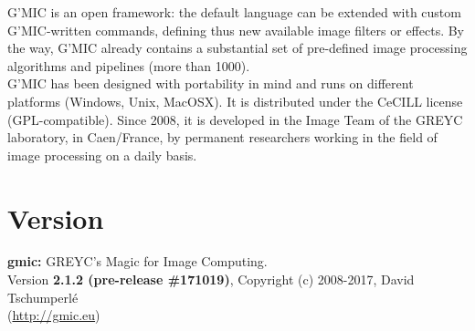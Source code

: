 \documentclass[a4paper,10.5pt,twoside]{book}
\newcommand{\Ca}[1]{\textcolor{ca}{#1}}
\newcommand{\Cb}[1]{\textcolor{cb}{#1}}
\newcommand{\Cc}[1]{\textcolor{cc}{#1}}
\begin{document}
\Cc{G'MIC} is an open framework: the default language can be extended with custom \Cc{G'MIC}-written commands, defining thus new available image filters or effects. By the way, \Cc{G'MIC} already contains a substantial set of pre-defined image processing algorithms and pipelines (more than 1000).\\ 
 
\Cc{G'MIC} has been designed with portability in mind and runs on different platforms (Windows, Unix, MacOSX). It is distributed under the CeCILL license (GPL-compatible). Since 2008, it is developed in the Image Team of the GREYC laboratory, in Caen/France, by permanent researchers working in the field of image processing on a daily basis. 
\section*{Version} 
 
 \Ca{\textbf{gmic:} GREYC's Magic for Image Computing.}\\ 
 
        \Cb{Version \textbf{2.1.2 (pre-release \#171019)}, Copyright (c) 2008-2017, David Tschumperl\'e}\\ 
        \Cb{(\url{http://gmic.eu})} 
\end{document}
